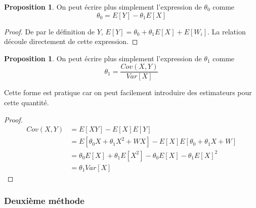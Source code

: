 \documentclass[a4paper,12pt]{report}
\theoremstyle{definition}
\renewcommand{\(}{\left(}
\renewcommand{\)}{\right)}
\newtheorem{prop}[thm]{Proposition}
\begin{document}
            \begin{leftbar}
            \begin{prop}
                On peut écrire plus simplement l'expression de $\theta_0$ comme
                $$\theta_0 = E[Y]-\theta_1E[X]$$
            \end{prop}
            \end{leftbar}
            
            \begin{proof}
                De par le définition de $Y$, $E[Y] = \theta_0+\theta_1E[X]+E[W_i]$. La relation découle directement de cette expression.
            \end{proof}
            
            \begin{leftbar}
            \begin{prop}
                On peut écrire plus simplement l'expression de $\theta_1$ comme
                $$\theta_1 = \frac{Cov(X,Y)}{Var[X]}$$
            \end{prop}
            \end{leftbar}
            Cette forme est pratique car on peut facilement introduire des estimateurs pour cette quantité.
            
            \begin{proof}
                \begin{align*}
                    Cov(X,Y) &= E[XY]-E[X]E[Y]\\
                    &= E[\theta_0X+\theta_1X^2+WX]-E[X]E[\theta_0+\theta_1X+W] \\
                    &= \theta_0E[X]+\theta_1E[X^2]-\theta_0E[X]-\theta_1E[X]^2 \\
                    &= \theta_1 Var[X]
                \end{align*}
            \end{proof}
            
            \subsubsection{Deuxième méthode}
            
\end{document}

